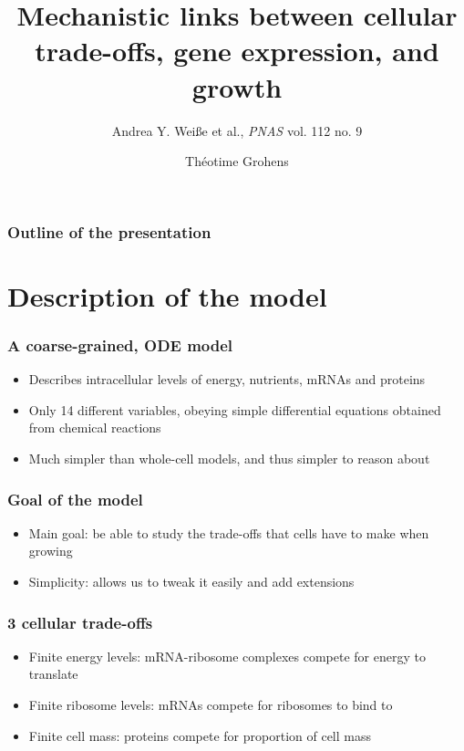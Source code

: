 \documentclass{beamer}
\begin{document}
\title[Mechanistic links between cellular trade-offs, gene expression, and growth]{Mechanistic links between cellular trade-offs, gene expression, and growth}
\author{Andrea Y. Weiße et al., \emph{PNAS} vol. 112 no. 9}
\date{Théotime Grohens}

\begin{frame}
\titlepage
\end{frame}

\begin{frame}
\frametitle{Outline of the presentation}
\tableofcontents[pausesections]
\end{frame}

\section{Description of the model}

\begin{frame}
\frametitle{A coarse-grained, ODE model}
\begin{itemize}
\item Describes intracellular levels of energy, nutrients, mRNAs and proteins
\item Only 14 different variables, obeying simple differential equations obtained from chemical reactions
\item Much simpler than whole-cell models, and thus simpler to reason about
\end{itemize}
\end{frame}

\begin{frame}
\frametitle{Goal of the model}
\begin{itemize}
\item Main goal: be able to study the trade-offs that cells have to make when growing
\item Simplicity: allows us to tweak it easily and add extensions
\end{itemize}
\end{frame}

\begin{frame}
\frametitle{3 cellular trade-offs}
\begin{itemize}
\item Finite energy levels: mRNA-ribosome complexes compete for energy to translate
\item Finite ribosome levels: mRNAs compete for ribosomes to bind to
\item Finite cell mass: proteins compete for proportion of cell mass
\end{itemize}
\end{frame}
\end{document}
